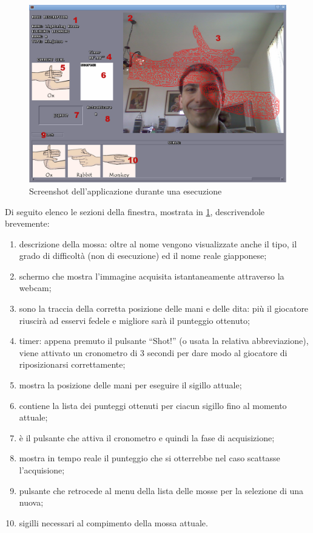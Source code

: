 \documentclass[a4paper,10pt, twocolumn]{article}
\begin{document}
  \begin{figure}
    \includegraphics[scale=0.25]{screenShot}
    \caption{Screenshot dell'applicazione durante una esecuzione}
  \label{screenshot}       
  \end{figure}
  
  Di seguito elenco le sezioni della finestra, mostrata in \ref{screenshot},
  descrivendole brevemente:
  \begin{enumerate}
   \item descrizione della mossa: oltre al nome vengono visualizzate anche il tipo,
	 il grado di difficolt\`{a} (non di esecuzione) ed il nome reale giapponese;
   \item schermo che mostra l'immagine acquisita istantaneamente attraverso la webcam;
   \item sono la traccia della corretta posizione delle mani e delle dita: pi\`{u} il
	 giocatore riuscir\`{a} ad esservi fedele e migliore sar\`{a} il punteggio ottenuto;
   \item timer: appena premuto il pulsante ``Shot!'' (o usata la relativa abbreviazione),
	 viene attivato un cronometro di 3 secondi per dare modo al giocatore di 
	 riposizionarsi correttamente;
   \item mostra la posizione delle mani per eseguire il sigillo attuale;
   \item contiene la lista dei punteggi ottenuti per ciacun sigillo fino al momento attuale;
   \item \`{e} il pulsante che attiva il cronometro e quindi la fase di acquisizione;
   \item mostra in tempo reale il punteggio che si otterrebbe nel caso scattasse l'acquisione;
   \item pulsante che retrocede al menu della lista delle mosse per la selezione di una nuova;
   \item sigilli necessari al compimento della mossa attuale.
  \end{enumerate}
\end{document}
